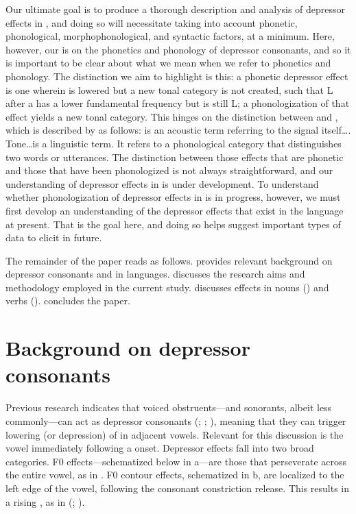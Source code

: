 \documentclass[output=paper
,newtxmath
,modfonts
,nonflat]{langsci/langscibook}
\begin{document}
Our ultimate goal is to produce a thorough description and analysis of depressor effects in , and doing so will necessitate taking into account phonetic, phonological, morphophonological, and syntactic factors, at a minimum. Here, however, our  is on the phonetics and phonology of  depressor consonants, and so it is important to be clear about what we mean when we refer to phonetics and phonology. The distinction we aim to highlight is this: a phonetic depressor effect is one wherein  is lowered but a new tonal category is not created, such that L after a  has a lower fundamental frequency but is still L; a phonologization of that effect yields a new tonal category. This hinges on the distinction between  and , which is described by \citet[5]{Yip2002} as follows: {\textquotedbl} is an acoustic term referring to the signal itself…. Tone…is a linguistic term. It refers to a phonological category that distinguishes two words or utterances.{\textquotedbl} The distinction between those effects that are phonetic and those that have been phonologized is not always straightforward, and our understanding of depressor effects in  is under development. To understand whether phonologization of depressor effects in  is in progress, however, we must first develop an understanding of the depressor effects that exist in the language at present. That is the goal here, and doing so helps suggest important types of data to elicit in future. 



The remainder of the paper reads as follows.  provides relevant background on depressor consonants and  in  languages.  discusses the research aims and methodology employed in the current study.  discusses  effects in nouns () and verbs ().  concludes the paper. 


\section{Background on depressor consonants}\label{sec:lotven:2}

Previous research indicates that voiced obstruents—and sonorants, albeit less commonly—can act as depressor consonants (\citealt{Ohala1973}; \citealt{Bradshaw1999}; \citealt{Tang2008}), meaning that they can trigger lowering (or depression) of  in adjacent vowels. Relevant for this discussion is the vowel immediately following a  onset. Depressor effects fall into two broad categories. F0  effects—schematized below in a—are those that perseverate across the entire vowel, as in  \citep{Oglesbee2008}. F0 contour effects, schematized in b, are localized to the left edge of the vowel, following the consonant constriction release. This results in a rising , as in  (\citealt{Lea1973}; \citealt{Oglesbee2008}). 
\end{document}
